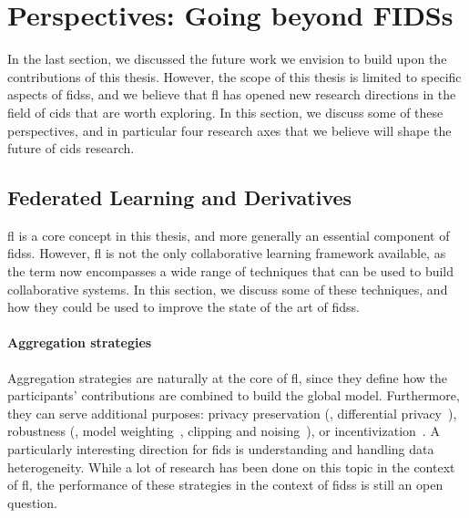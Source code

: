 \section{Perspectives: Going beyond FIDSs\label{sec:conclusion.perspectives}}

In the last section, we discussed the future work we envision to build upon the contributions of this thesis.
However, the scope of this thesis is limited to specific aspects of \glspl{fids}, and we believe that \gls{fl} has opened new research directions in the field of \gls{cids} that are worth exploring.
In this section, we discuss some of these perspectives, and in particular four research axes that we believe will shape the future of \gls{cids} research.


\subsection{Federated Learning and Derivatives\label{sec:conclusion.perspectives.fl}}

\Gls{fl} is a core concept in this thesis, and more generally an essential component of \glspl{fids}.
However, \gls{fl} is not the only collaborative learning framework available, as the term now encompasses a wide range of techniques that can be used to build collaborative systems.
In this section, we discuss some of these techniques, and how they could be used to improve the state of the art of \glspl{fids}.


\paragraph{Aggregation strategies}

Aggregation strategies are naturally at the core of \gls{fl}, since they define how the participants' contributions are combined to build the global model.
Furthermore, they can serve additional purposes: privacy preservation (\eg, differential privacy~\cite{mokry_EfficientPrivacyPreservingCollaborative_2021}), robustness (\eg, model weighting~\cite{fung_LimitationsFederatedLearning_2020}, clipping and noising~\cite{nguyen_FLAMETamingBackdoors_2022}), or incentivization~\cite{deng_FAIRQualityAwareFederated_2021}.
A particularly interesting direction for \gls{fids} is understanding and handling data heterogeneity.
While a lot of research has been done on this topic in the context of \gls{fl}, the performance of these strategies in the context of \glspl{fids} is still an open question.


